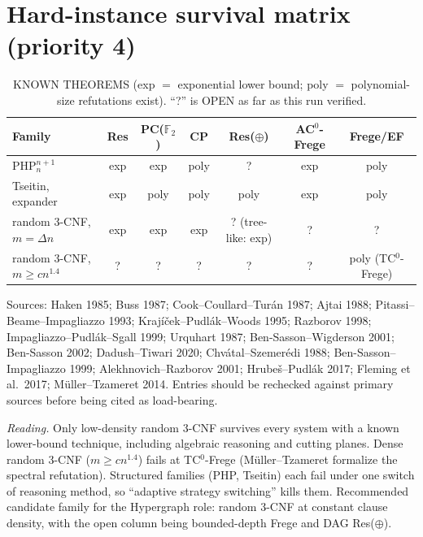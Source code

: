 \documentclass[11pt]{article}
\begin{document}
\section{Hard-instance survival matrix (priority 4)}
\begin{table}[h]\centering\small
\caption{KNOWN THEOREMS (exp $=$ exponential lower bound; poly $=$
polynomial-size refutations exist). ``?'' is OPEN as far as this run verified.}
\label{tab:surv}
\begin{tabular}{lcccccc}
\toprule
Family & Res & PC($\mathbb F_2$) & CP & Res($\oplus$) & AC$^0$-Frege & Frege/EF\\
\midrule
PHP$^{n+1}_n$ & exp & exp & poly & ? & exp & poly\\
Tseitin, expander & exp & poly & poly & poly & exp & poly\\
random 3-CNF, $m=\Delta n$ & exp & exp & exp & ? (tree-like: exp) & ? & ?\\
random 3-CNF, $m\ge cn^{1.4}$ & ? & ? & ? & ? & ? & poly (TC$^0$-Frege)\\
\bottomrule
\end{tabular}
\end{table}
Sources: Haken 1985; Buss 1987; Cook--Coullard--Tur\'an 1987; Ajtai 1988;
Pitassi--Beame--Impagliazzo 1993; Kraj\'i\v cek--Pudl\'ak--Woods 1995;
Razborov 1998; Impagliazzo--Pudl\'ak--Sgall 1999; Urquhart 1987;
Ben-Sasson--Wigderson 2001; Ben-Sasson 2002; Dadush--Tiwari 2020;
Chv\'atal--Szemer\'edi 1988; Ben-Sasson--Impagliazzo 1999;
Alekhnovich--Razborov 2001; Hrube\v s--Pudl\'ak 2017; Fleming et al.\ 2017;
M\"uller--Tzameret 2014. Entries should be rechecked against primary
sources before being cited as load-bearing.

\emph{Reading.} Only low-density random 3-CNF survives every system with a
known lower-bound technique, including algebraic reasoning and cutting
planes. Dense random 3-CNF ($m\ge cn^{1.4}$) fails at TC$^0$-Frege (M\"uller--Tzameret formalize the
spectral refutation). Structured families (PHP, Tseitin) each fail under one
switch of reasoning method, so ``adaptive strategy switching'' kills them.
Recommended candidate family for the Hypergraph role: random 3-CNF at
constant clause density, with the open column being bounded-depth Frege and
DAG Res($\oplus$).
\end{document}
